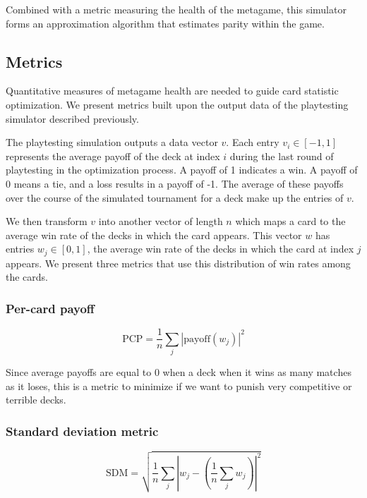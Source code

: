 Combined with a metric measuring the health of the metagame, this simulator 
forms an approximation algorithm that estimates parity within the game.

\subsection{Metrics} \label{sec:metrics}

Quantitative measures of metagame health are needed to guide 
card statistic optimization. We present metrics built upon the
output data of the playtesting simulator described previously.

The playtesting simulation outputs a data vector $v$.
Each entry $v_i \in [-1, 1]$ represents the average payoff of
the deck at index $i$ during the last round of playtesting in
the optimization process. A payoff of 1 indicates a win. A
payoff of 0 means a tie, and a loss results in a payoff of -1.
The average of these payoffs over the course of the simulated
tournament for a deck make up the entries of $v$.

We then transform $v$ into another vector of length $n$ which maps a card to the
average win rate of the decks in which the card appears. This
vector $w$ has entries
$w_j \in [0, 1]$, the average win rate of the decks in which
the card at index $j$ appears. We present three metrics that 
use this distribution of win rates among the cards.

\subsubsection{Per-card payoff}

\begin{equation}
	\mathrm{PCP} = \frac{1}{n} \sum_j \left|\mathrm{payoff}(w_j)\right|^2
\end{equation}

Since average payoffs are equal to 0 when a deck when it wins as many matches as it loses, this is a metric to 
minimize if we want to punish very competitive or terrible decks.

\subsubsection{Standard deviation metric}

\begin{equation}
	\mathrm{SDM} = \sqrt{\frac{1}{n} \sum_j \left|w_j - \left(\frac{1}{n}\sum_j w_j\right)\right|^2}
\end{equation}

